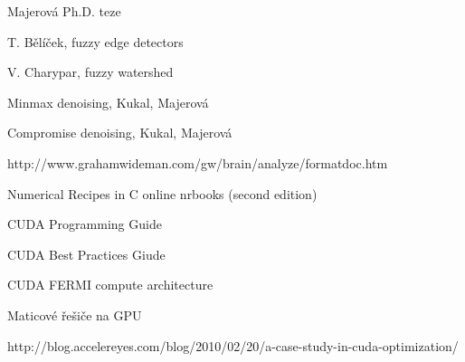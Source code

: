 \begin{thebibliography}{9}
        Majerová Ph.D. teze

        T. Bělíček, fuzzy edge detectors

        V. Charypar, fuzzy watershed

        Minmax denoising, Kukal, Majerová

        Compromise denoising, Kukal, Majerová

        http://www.grahamwideman.com/gw/brain/analyze/formatdoc.htm

        Numerical Recipes in C online nrbooks (second edition)

        CUDA Programming Guide

        CUDA Best Practices Giude

        CUDA FERMI compute architecture

        Maticové řešiče na GPU

        http://blog.accelereyes.com/blog/2010/02/20/a-case-study-in-cuda-optimization/
        
\end{thebibliography} 